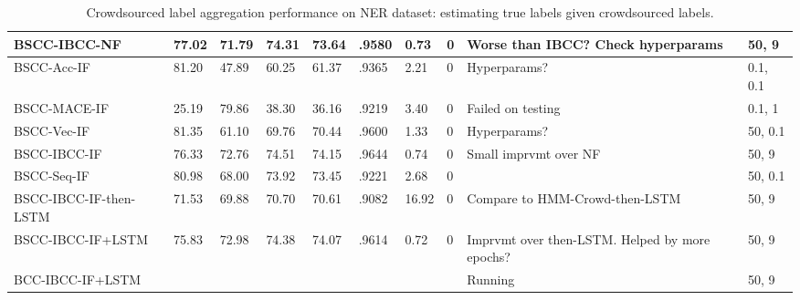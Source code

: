 \begin{table}
\begin{tabularx}{\textwidth}{| l | X | X | X | X | X | X | X | X | X |}
BSCC-IBCC-NF & 77.02 & 71.79 & 74.31 & 73.64 & .9580 & 0.73 & 0 & Worse than IBCC? Check hyperparams & 50, 9\\ \hline
BSCC-Acc-IF & 81.20 & 47.89 & 60.25 & 61.37 & .9365 & 2.21 & 0 & Hyperparams? & 0.1, 0.1 \\
BSCC-MACE-IF & 25.19 & 79.86 & 38.30 & 36.16 & .9219 & 3.40 & 0 & Failed on testing & 0.1, 1\\
BSCC-Vec-IF & 81.35 & 61.10 & 69.76 & 70.44 & .9600 & 1.33 & 0 & Hyperparams? & 50, 0.1 \\
BSCC-IBCC-IF & 76.33 & 72.76 & 74.51 & 74.15 & .9644 & 0.74 & 0 & Small imprvmt over NF & 50, 9\\
BSCC-Seq-IF & 80.98 & 68.00 & 73.92 & 73.45 & .9221 & 2.68 & 0 & & 50, 0.1\\ \hline
BSCC-IBCC-IF-then-LSTM & 71.53 & 69.88 & 70.70 & 70.61 & .9082 & 16.92 & 0 & Compare to HMM-Crowd-then-LSTM & 50, 9\\
BSCC-IBCC-IF+LSTM & 75.83 & 72.98 & 74.38 & 74.07 & .9614 & 0.72 & 0 & Imprvmt over then-LSTM. Helped by more epochs? & 50, 9\\ 
BCC-IBCC-IF+LSTM & & & & & & & & Running & 50, 9 \\ %
\hline
\end{tabularx}
\caption{Crowdsourced label aggregation performance on NER dataset: estimating true labels given crowdsourced labels.}
\label{tab:aggregation_results_ner}
\npnoround
\end{table}

